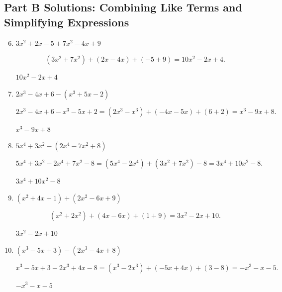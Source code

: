 \documentclass[14pt]{extarticle}
\begin{document}
\subsection*{Part B Solutions: Combining Like Terms and Simplifying Expressions}
\begin{enumerate}
  \setcounter{enumi}{5}
  \item \(3x^2 + 2x - 5 + 7x^2 - 4x + 9\)

  \[
  (3x^2 + 7x^2) + (2x - 4x) + (-5 + 9)
  = 10x^2 - 2x + 4.
  \]

  \(\boxed{10x^2 - 2x + 4}\)

  \item \(2x^3 - 4x + 6 - (x^3 + 5x - 2)\)

  \[
  2x^3 - 4x + 6 - x^3 - 5x + 2
  = (2x^3 - x^3) + (-4x - 5x) + (6 + 2)
  = x^3 - 9x + 8.
  \]

  \(\boxed{x^3 - 9x + 8}\)

  \item \(5x^4 + 3x^2 - (2x^4 - 7x^2 + 8)\)

  \[
  5x^4 + 3x^2 - 2x^4 + 7x^2 - 8
  = (5x^4 - 2x^4) + (3x^2 + 7x^2) - 8
  = 3x^4 + 10x^2 - 8.
  \]

  \(\boxed{3x^4 + 10x^2 - 8}\)

  \item \((x^2 + 4x + 1) + (2x^2 - 6x + 9)\)

  \[
  (x^2 + 2x^2) + (4x - 6x) + (1 + 9)
  = 3x^2 - 2x + 10.
  \]

  \(\boxed{3x^2 - 2x + 10}\)

  \item \((x^3 - 5x + 3) - (2x^3 - 4x + 8)\)

  \[
  x^3 - 5x + 3 - 2x^3 + 4x - 8
  = (x^3 - 2x^3) + (-5x + 4x) + (3 - 8)
  = -x^3 - x - 5.
  \]

  \(\boxed{-x^3 - x - 5}\)
\end{enumerate}
\end{document}
